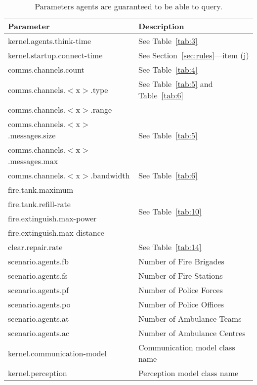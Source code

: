 \documentclass{article}
\begin{document}
\begin{table}[htb]
\caption{Parameters agents are guaranteed to be able to query.}
\label{tab:16}
\centering
\begin{tabular}{ll}
  \hline
  \textbf{Parameter}                    & \textbf{Description} \\
  \hline
  kernel.agents.think-time              & See Table~\ref{tab:3} \\
  \hline
  kernel.startup.connect-time           & See Section~\ref{sec:rules}---item
  (j) \\
  \hline
  comms.channels.count                  & See Table~\ref{tab:4} \\
  \hline
  comms.channels.$<$x$>$.type           & See Table~\ref{tab:5} and 
  Table~\ref{tab:6} \\
  \hline
  comms.channels.$<$x$>$.range          & \multirow{3}{*}{See 
  Table~\ref{tab:5}} \\
  comms.channels.$<$x$>$.messages.size  & \\
  comms.channels.$<$x$>$.messages.max   & \\
  \hline
  comms.channels.$<$x$>$.bandwidth      & See Table~\ref{tab:6} \\
  \hline
  fire.tank.maximum                     & \multirow{4}{*}{See 
  Table~\ref{tab:10}} \\
  fire.tank.refill-rate                 & \\
  fire.extinguish.max-power             & \\
  fire.extinguish.max-distance          & \\
  \hline
  clear.repair.rate                     & See Table~\ref{tab:14} \\
  \hline
  scenario.agents.fb                    & Number of Fire Brigades \\
  \hline
  scenario.agents.fs                    & Number of Fire Stations \\
  \hline
  scenario.agents.pf                    & Number of Police Forces \\
  \hline
  scenario.agents.po                    & Number of Police Offices \\
  \hline
  scenario.agents.at                    & Number of Ambulance Teams \\
  \hline
  scenario.agents.ac                    & Number of Ambulance Centres \\
  \hline
  kernel.communication-model            & Communication model class name \\
  \hline
  kernel.perception                     & Perception model class name \\
  \hline
\end{tabular}
\end{table}
\end{document}
